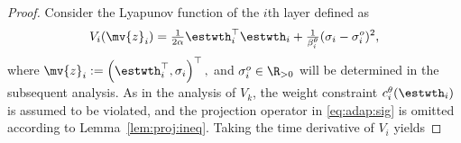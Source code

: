 \documentclass[letterpaper, journal]{IEEEtran}
\providecommand{\DIFaddbegin}{} %
\providecommand{\DIFaddend}{} %
\providecommand{\DIFdelbegin}{} %
\providecommand{\DIFdelend}{} %
\begin{document}
\begin{proof}
Consider the Lyapunov function of the $i$th layer defined as
\DIFdelbegin %
\DIFdelend \DIFaddbegin \begin{equation} \label{eq:Vi:def}
  V_{i}(\mv{z}_i)
  =
  \tfrac{1}{2\alpha}\estwth_i^\top\estwth_i
  +
  \tfrac{1}{\beta_i^\theta}(\sigma_i-\sigma_i^o)^2
  ,
\end{equation}\DIFaddend 
where 
$
  \mv{z}_i:=
  \left(
    \estwth_i^\top,
    \sigma_i
  \right)^\top
  ,
$
and $\sigma_i^o\in\R_{>0}$ will be determined in the subsequent analysis.
As in the analysis of $V_k$, the weight constraint $c_i^{\theta}(\estwth_i)$ is assumed to be violated, and the projection operator in \eqref{eq:adap:sig} is omitted according to Lemma~\ref{lem:proj:ineq}.
Taking the time derivative of $V_i$ yields
\DIFdelbegin %

\end{proof}
\end{document}
